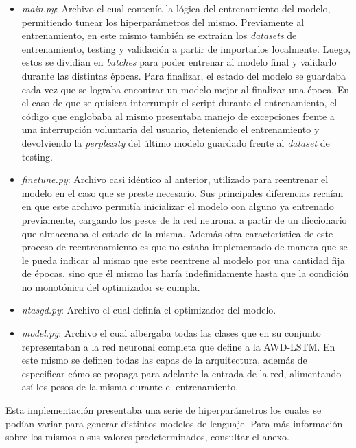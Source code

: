 \begin{itemize}
    \item \textit{main.py}: Archivo el cual contenía la lógica del entrenamiento del modelo, permitiendo tunear los hiperparámetros del mismo. Previamente al entrenamiento, en este mismo también se extraían los \textit{datasets} de entrenamiento, testing y validación a partir de importarlos localmente. Luego, estos se dividían en \textit{batches} para poder entrenar al modelo final y validarlo durante las distintas épocas. Para finalizar, el estado del modelo se guardaba cada vez que se lograba encontrar un modelo mejor al finalizar una época. En el caso de que se quisiera interrumpir el script durante el entrenamiento, el código que englobaba al mismo presentaba manejo de excepciones frente a una interrupción voluntaria del usuario, deteniendo el entrenamiento y devolviendo la \textit{perplexity} del último modelo guardado frente al \textit{dataset} de testing.
    \item \textit{finetune.py}: Archivo casi idéntico al anterior, utilizado para reentrenar el modelo en el caso que se preste necesario. Sus principales diferencias recaían en que este archivo permitía inicializar el modelo con alguno ya entrenado previamente, cargando los pesos de la red neuronal a partir de un diccionario que almacenaba el estado de la misma. Además otra característica de este proceso de reentrenamiento es que no estaba implementado de manera que se le pueda indicar al mismo que este reentrene al modelo por una cantidad fija de épocas, sino que él mismo las haría indefinidamente hasta que la condición no monotónica del optimizador se cumpla.
    \item \textit{ntasgd.py}: Archivo el cual definía el optimizador del modelo.
    \item \textit{model.py}: Archivo el cual albergaba todas las clases que en su conjunto representaban a la red neuronal completa que define a la AWD-LSTM. En este mismo se definen todas las capas de la arquitectura, además de especificar cómo se propaga para adelante la entrada de la red, alimentando así los pesos de la misma durante el entrenamiento.
\end{itemize}



Esta implementación presentaba una serie de hiperparámetros los cuales se podían variar para generar distintos modelos de lenguaje. Para más información sobre los mismos o sus valores predeterminados, consultar el anexo.

